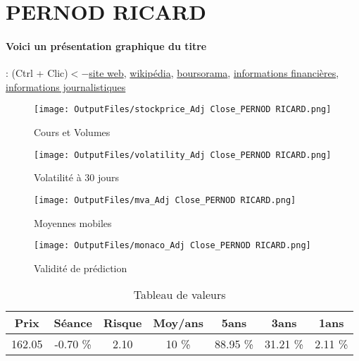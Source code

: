 \documentclass[11pt,a4paper]{report}%
\begin{document}
\newpage

\section{PERNOD RICARD}

\paragraph{Voici un présentation graphique du titre} : (Ctrl + Clic)$<-$\href{https://www.pernod-ricard.com/fr/investisseurs/notre-agenda/carrieres/}{site web}, \href{https://fr.wikipedia.org/wiki/Pernod_Ricard}{wikipédia}, \href{https://www.boursorama.com/cours/1rPRI}{boursorama}, \href{https://www.qwant.com/?q=site:https:%2f%2fwww.easybourse.com%2faction-societe%2fPERNOD-RICARD&t=web&client=ext-firefox-hp}{informations financières}, \href{https://bourse.lerevenu.com/cours-de-bourse/fiche-valeur-synthese/PERNOD-RICARD/RI-FR}{informations journalistiques}
\begin{figure}[!htb]
   \begin{minipage}{0.5\textwidth}
     \centering
     \texttt{[image: OutputFiles/stockprice\_Adj Close\_PERNOD RICARD.png]}
     \caption{Cours et Volumes}\label{Fig:price_PERNOD RICARD}
   \end{minipage}\hfill
   \begin{minipage}{0.5\textwidth}
     \centering
     \texttt{[image: OutputFiles/volatility\_Adj Close\_PERNOD RICARD.png]}
     \caption{Volatilité à 30 jours}\label{Fig:volat_PERNOD RICARD}
   \end{minipage}
\end{figure}
\begin{figure}[!htb]
   \begin{minipage}{0.5\textwidth}
     \centering
     \texttt{[image: OutputFiles/mva\_Adj Close\_PERNOD RICARD.png]}
     \caption{Moyennes mobiles}\label{Fig:mva_PERNOD RICARD}
   \end{minipage}\hfill
   \begin{minipage}{0.5\textwidth}
     \centering
     \texttt{[image: OutputFiles/monaco\_Adj Close\_PERNOD RICARD.png]}
     \caption{Validité de prédiction}\label{Fig:prediction_PERNOD RICARD}
   \end{minipage}
\end{figure}

\begin{table}[H]
  \centering
    \begin{tabular}{|c|c|c|c|c|c|c|}
    \hline
    Prix & Séance & Risque  & Moy/ans & 5ans & 3ans & 1ans \\
    \hline
    162.05 &    -0.70 \%    & 2.10 & 10 \% & 88.95 \% & 31.21 \% & 2.11 \% \\
    \hline
    \end{tabular}%
        \label{tab:table_PERNOD RICARD}%
      \caption{Tableau de valeurs}
\end{table}%
\end{document}
